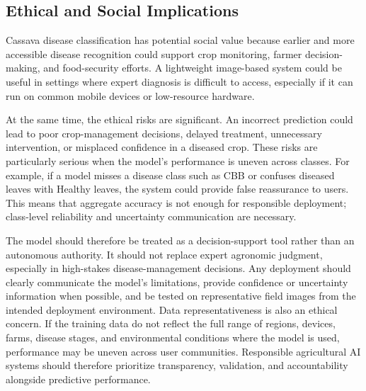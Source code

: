 \documentclass[11pt]{article}
\begin{document}
\subsection{Ethical and Social Implications}

Cassava disease classification has potential social value because earlier and more accessible disease recognition could support crop monitoring, farmer decision-making, and food-security efforts. A lightweight image-based system could be useful in settings where expert diagnosis is difficult to access, especially if it can run on common mobile devices or low-resource hardware.

At the same time, the ethical risks are significant. An incorrect prediction could lead to poor crop-management decisions, delayed treatment, unnecessary intervention, or misplaced confidence in a diseased crop. These risks are particularly serious when the model's performance is uneven across classes. For example, if a model misses a disease class such as CBB or confuses diseased leaves with Healthy leaves, the system could provide false reassurance to users. This means that aggregate accuracy is not enough for responsible deployment; class-level reliability and uncertainty communication are necessary.

The model should therefore be treated as a decision-support tool rather than an autonomous authority. It should not replace expert agronomic judgment, especially in high-stakes disease-management decisions. Any deployment should clearly communicate the model's limitations, provide confidence or uncertainty information when possible, and be tested on representative field images from the intended deployment environment. Data representativeness is also an ethical concern. If the training data do not reflect the full range of regions, devices, farms, disease stages, and environmental conditions where the model is used, performance may be uneven across user communities. Responsible agricultural AI systems should therefore prioritize transparency, validation, and accountability alongside predictive performance.

\newpage



\end{document}
